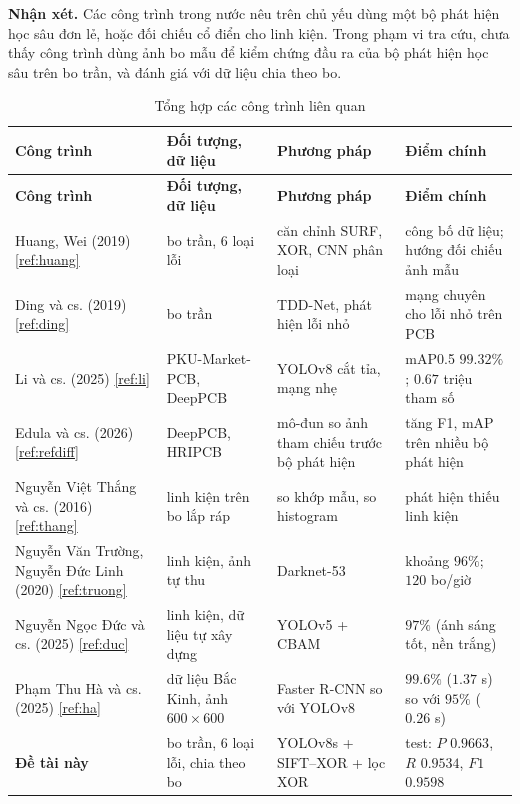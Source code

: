 \documentclass[11pt,a4paper]{article}
\newcommand{\tlr}[1]{\ref{ref:#1}}
\begin{document}
\textbf{Nhận xét.} Các công trình trong nước nêu trên chủ yếu dùng một bộ phát hiện học sâu đơn lẻ, hoặc đối chiếu cổ điển cho linh kiện. Trong phạm vi tra cứu, chưa thấy công trình dùng ảnh bo mẫu để kiểm chứng đầu ra của bộ phát hiện học sâu trên bo trần, và đánh giá với dữ liệu chia theo bo.

\begin{center}
\small
\begin{longtable}{>{\raggedright\arraybackslash}p{2.7cm}|>{\raggedright\arraybackslash}p{3.1cm}|>{\raggedright\arraybackslash}p{3.7cm}|>{\raggedright\arraybackslash}p{3.9cm}}
\caption{Tổng hợp các công trình liên quan}\label{tab:congtrinh}\\
\toprule
\textbf{Công trình} & \textbf{Đối tượng, dữ liệu} & \textbf{Phương pháp} & \textbf{Điểm chính} \\ \midrule
\endfirsthead
\toprule
\textbf{Công trình} & \textbf{Đối tượng, dữ liệu} & \textbf{Phương pháp} & \textbf{Điểm chính} \\ \midrule
\endhead
Huang, Wei (2019) \tlr{huang} & bo trần, 6 loại lỗi & căn chỉnh SURF, XOR, CNN phân loại & công bố dữ liệu; hướng đối chiếu ảnh mẫu \\ \midrule
Ding và cs. (2019) \tlr{ding} & bo trần & TDD-Net, phát hiện lỗi nhỏ & mạng chuyên cho lỗi nhỏ trên PCB \\ \midrule
Li và cs. (2025) \tlr{li} & PKU-Market-PCB, DeepPCB & YOLOv8 cắt tỉa, mạng nhẹ & mAP0.5 $99.32\%$; $0.67$ triệu tham số \\ \midrule
Edula và cs. (2026) \tlr{refdiff} & DeepPCB, HRIPCB & mô-đun so ảnh tham chiếu trước bộ phát hiện & tăng F1, mAP trên nhiều bộ phát hiện \\ \midrule
Nguyễn Việt Thắng và cs. (2016) \tlr{thang} & linh kiện trên bo lắp ráp & so khớp mẫu, so histogram & phát hiện thiếu linh kiện \\ \midrule
Nguyễn Văn Trường, Nguyễn Đức Linh (2020) \tlr{truong} & linh kiện, ảnh tự thu & Darknet-53 & khoảng $96\%$; $120$ bo/giờ \\ \midrule
Nguyễn Ngọc Đức và cs. (2025) \tlr{duc} & linh kiện, dữ liệu tự xây dựng & YOLOv5 + CBAM & $97\%$ (ánh sáng tốt, nền trắng) \\ \midrule
Phạm Thu Hà và cs. (2025) \tlr{ha} & dữ liệu Bắc Kinh, ảnh $600\times600$ & Faster R-CNN so với YOLOv8 & $99.6\%$ ($1.37$ s) so với $95\%$ ($0.26$ s) \\ \midrule
\textbf{Đề tài này} & bo trần, 6 loại lỗi, chia theo bo & YOLOv8s + SIFT--XOR + lọc XOR & test: $P$ $0.9663$, $R$ $0.9534$, $F1$ $0.9598$ \\ \bottomrule
\end{longtable}
\end{center}
\end{document}
